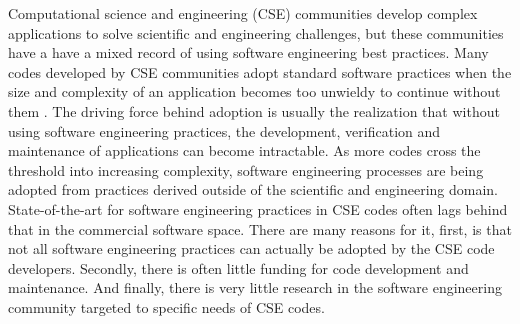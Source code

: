 \label{sec:introduction}
Computational science and engineering (CSE) communities develop
complex applications to solve scientific and engineering challenges,
but these communities have a have a mixed record of using software
engineering best practices. Many codes developed by CSE communities
adopt standard software practices when the size and complexity of an
application becomes too unwieldy to continue without them
\cite{cc2012}. The driving force behind adoption is usually the
realization that without using software engineering practices, the
development, verification and maintenance of applications can become
intractable. As more codes cross the threshold into increasing
complexity, software engineering processes are being adopted from
practices derived outside of the scientific and engineering domain.
State-of-the-art for software engineering practices in CSE codes often lags
behind that in the commercial software space. 
There are many reasons for it, first, is
that not all software engineering practices can actually be adopted by
the CSE code developers.  Secondly, there is often little funding for
code development and maintenance. And finally, there is very little
research in the software engineering community targeted to specific
needs of CSE codes. 

